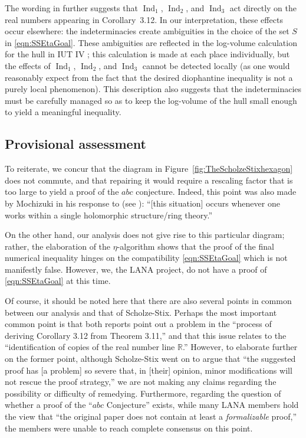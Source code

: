 \documentclass[12pt, reqno, a4paper]{amsart}
\def\bR{\mathbb{R}} %
\DeclareMathOperator{\Ind}{Ind}
\def\IndOne{\Ind_1}
\def\IndTwo{\Ind_2}
\def\IndThree{\Ind_3}
\begin{document}
The wording in \cite{Scholze2018WhyA} further suggests that $\IndOne$, $\IndTwo$, and $\IndThree$ act directly on the real numbers appearing in Corollary~3.12. In our interpretation, these effects occur elsewhere: the indeterminacies create ambiguities in the choice of the set $S$ in \eqref{eqn:SSEtaGoal}. These ambiguities are reflected in the log-volume calculation for the hull in IUT IV \cite{MR4225476}; this calculation is made at each place individually, but the effects of $\IndOne$, $\IndTwo$, and $\IndThree$ cannot be detected locally (as one would reasonably expect from the  fact that the desired diophantine inequality is not a purely local phenomenon). This description also suggests that the indeterminacies must be carefully managed so as to keep the log-volume of the hull small enough to yield a meaningful inequality.


\subsection{Provisional assessment}\label{sub:SSAssessmentNew}

To reiterate, we concur that the diagram in Figure~\ref{fig:TheScholzeStixhexagon} does not commute,
and that repairing it would require a rescaling factor that is too large to yield a proof of the $abc$ conjecture. Indeed, this point was also made by Mochizuki in his response to \cite{Scholze2018WhyA} 
(see \cite[\S 12, (IUAD)]{Mochizuki2018}): ``[this situation] occurs whenever one works within a single
holomorphic structure/ring theory.''

On the other hand, our analysis does not give rise to this particular diagram;
rather, the elaboration of the $\eta$-algorithm shows that the proof of the final numerical inequality hinges on the compatibility \eqref{eqn:SSEtaGoal} which is not manifestly false.
However, we, the LANA project, do not have a proof of \eqref{eqn:SSEtaGoal} at this time.


Of course, it should be noted here that there are also several points in common between our analysis and that of Scholze-Stix. Perhaps the most important common point is that both reports point out a problem in the ``process of deriving Corollary 3.12 from Theorem 3.11,'' and that this issue relates to the ``identification of copies of the real number line $\bR$.'' However, to elaborate further on the former point, although Scholze-Stix went on to argue that ``the suggested proof has [a problem] so severe that, in [their] opinion, minor modifications will not rescue the proof strategy,'' we are not making any claims regarding the possibility or difficulty of remedying. Furthermore, regarding the question of whether a proof of the ``$abc$ Conjecture'' exists, while many LANA members hold the view that ``the original paper does not contain at least a {\it formalizable} proof,'' the members were unable to reach complete consensus on this point.
\end{document}
